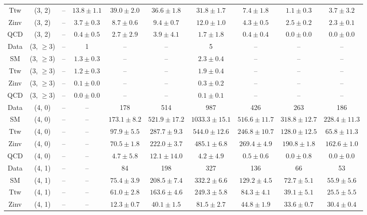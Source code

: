 \begin{table}[h!]
{\begin{tabular}{cccccccccc}
	Ttw & (3, 2) & -- & $13.8\pm 1.1$ & $39.0\pm 2.0$ & $36.6\pm 1.8$ & $31.8\pm 1.7$ & $7.4\pm 1.8$ & $1.1\pm 0.3$ & $3.7\pm 3.2$ \\[0.5ex] 
	Zinv & (3, 2) & -- & $3.7\pm 0.3$ & $8.7\pm 0.6$ & $9.4\pm 0.7$ & $12.0\pm 1.0$ & $4.3\pm 0.5$ & $2.5\pm 0.2$ & $2.3\pm 0.1$ \\[0.5ex] 
	QCD & (3, 2) & -- & $0.4\pm 0.5$ & $2.7\pm 2.9$ & $3.9\pm 4.1$ & $1.7\pm 1.8$ & $0.4\pm 0.4$ & $0.0\pm 0.0$ & $0.0\pm 0.0$ \\[0.5ex] 
	Data & (3, $\ge3$) & -- & 1 & -- & -- & 5 & -- & -- & -- \\[0.5ex] 
	SM & (3, $\ge3$) & -- & $1.3\pm 0.3$ & -- & -- & $2.3\pm 0.4$ & -- & -- & -- \\[0.5ex] 
	Ttw & (3, $\ge3$) & -- & $1.2\pm 0.3$ & -- & -- & $1.9\pm 0.4$ & -- & -- & -- \\[0.5ex] 
	Zinv & (3, $\ge3$) & -- & $0.1\pm 0.0$ & -- & -- & $0.3\pm 0.2$ & -- & -- & -- \\[0.5ex] 
	QCD & (3, $\ge3$) & -- & $0.0\pm 0.0$ & -- & -- & $0.1\pm 0.1$ & -- & -- & -- \\[0.5ex] 
	Data & (4, 0) & -- & -- & 178 & 514 & 987 & 426 & 263 & 186 \\[0.5ex] 
	SM & (4, 0) & -- & -- & $173.1\pm 8.2$ & $521.9\pm 17.2$ & $1033.3\pm 15.1$ & $516.6\pm 11.7$ & $318.8\pm 12.7$ & $228.4\pm 11.3$ \\[0.5ex] 
	Ttw & (4, 0) & -- & -- & $97.9\pm 5.5$ & $287.7\pm 9.3$ & $544.0\pm 12.6$ & $246.8\pm 10.7$ & $128.0\pm 12.5$ & $65.8\pm 11.3$ \\[0.5ex] 
	Zinv & (4, 0) & -- & -- & $70.5\pm 1.8$ & $222.0\pm 3.7$ & $485.1\pm 6.8$ & $269.4\pm 4.9$ & $190.8\pm 1.8$ & $162.6\pm 1.0$ \\[0.5ex] 
	QCD & (4, 0) & -- & -- & $4.7\pm 5.8$ & $12.1\pm 14.0$ & $4.2\pm 4.9$ & $0.5\pm 0.6$ & $0.0\pm 0.8$ & $0.0\pm 0.0$ \\[0.5ex] 
	Data & (4, 1) & -- & -- & 84 & 198 & 327 & 136 & 66 & 53 \\[0.5ex] 
	SM & (4, 1) & -- & -- & $75.4\pm 3.9$ & $208.5\pm 7.4$ & $332.2\pm 6.6$ & $129.2\pm 4.5$ & $72.7\pm 5.1$ & $55.9\pm 5.6$ \\[0.5ex] 
	Ttw & (4, 1) & -- & -- & $61.0\pm 2.8$ & $163.6\pm 4.6$ & $249.3\pm 5.8$ & $84.3\pm 4.1$ & $39.1\pm 5.1$ & $25.5\pm 5.5$ \\[0.5ex] 
	Zinv & (4, 1) & -- & -- & $12.3\pm 0.7$ & $40.1\pm 1.5$ & $81.5\pm 2.7$ & $44.8\pm 1.9$ & $33.6\pm 0.7$ & $30.4\pm 0.4$ \\[0.5ex] 

\end{tabular}}
\end{table}
